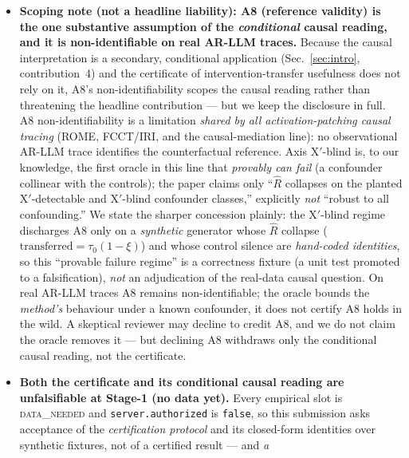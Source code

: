 \documentclass[11pt]{article}
\theoremstyle{plain}
\theoremstyle{definition}
\newcommand{\Rhat}{\widehat{R}}
\begin{document}
\begin{itemize}[leftmargin=1.4em,itemsep=2pt]
  which are strictly weaker than the distributional sign-symmetry a sign flip would
  need, so we do \emph{not} claim it is exact for $R=0$ (the earlier
  ``exact-by-construction under A6'' assertion is withdrawn). The primary $p$-value
  therefore does not borrow validity from the very A6 premise it helps probe.
  \item \textbf{Scoping note (not a headline liability): A8 (reference validity) is
  the one substantive assumption of the \emph{conditional} causal reading, and it is
  non-identifiable on real AR-LLM traces.} Because the causal interpretation is a
  secondary, conditional application (Sec.~\ref{sec:intro}, contribution~4) and the
  certificate of intervention-transfer usefulness does not rely on it, A8's
  non-identifiability scopes the causal reading rather than threatening the headline
  contribution --- but we keep the disclosure in full. A8 non-identifiability is a
  limitation \emph{shared by all activation-patching causal tracing} (ROME, FCCT/IRI,
  and the causal-mediation line): no observational AR-LLM trace identifies the
  counterfactual reference. Axis X$'$-blind is, to our knowledge, the first oracle in
  this line that \emph{provably can fail} (a confounder collinear with the controls);
  the paper claims only ``$\Rhat$ collapses on the planted X$'$-detectable and
  X$'$-blind confounder classes,'' explicitly \emph{not} ``robust to all
  confounding.'' We state the sharper concession plainly: the X$'$-blind regime
  discharges A8 only on a \emph{synthetic} generator whose $\Rhat$ collapse
  ($\text{transferred}=\tau_0(1-\xi)$) and whose control silence are \emph{hand-coded
  identities}, so this ``provable failure regime'' is a correctness fixture (a unit
  test promoted to a falsification), \emph{not} an adjudication of the real-data
  causal question. On real AR-LLM traces A8 remains non-identifiable; the oracle
  bounds the \emph{method's} behaviour under a known confounder, it does not certify
  A8 holds in the wild. A skeptical reviewer may decline to credit A8, and we do not
  claim the oracle removes it --- but declining A8 withdraws only the conditional
  causal reading, not the certificate.
  \item \textbf{Both the certificate and its conditional causal reading are
  unfalsifiable at Stage-1 (no data yet).} Every empirical slot is
  \textsc{data\_needed} and \texttt{server.authorized} is \texttt{false}, so this
  submission asks acceptance of the \emph{certification protocol} and its closed-form
  identities over synthetic fixtures, not of a certified result --- and \emph{a
}
\end{itemize}
\end{document}
